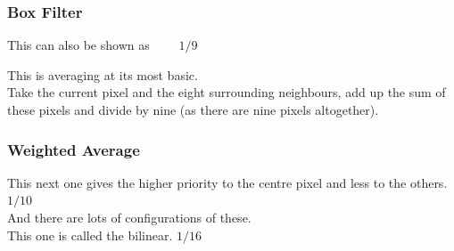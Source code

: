 \begin{frame}\frametitle{Box Filter}

 This can also be shown as \ \ \ \ 
$1/9$ \\
\vspace{0.5cm}



This is averaging at its most basic. \\
Take the current pixel and the eight surrounding neighbours, add up the sum of these pixels and divide by nine (as there are nine pixels altogether).


\end{frame}
\begin{frame}\frametitle{Weighted Average}
This next one gives the higher priority to the centre pixel and less to the others.\\
$1/10$ \\
And there are lots of configurations of these. \\This one is called the bilinear.
$1/16$ \\
\end{frame}

